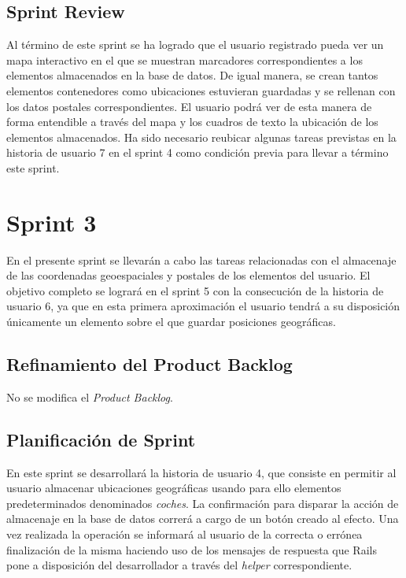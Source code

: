 	\subsection{Sprint Review}
	Al término de este sprint se ha logrado que el usuario registrado pueda ver un mapa interactivo en el que se muestran marcadores correspondientes a los elementos almacenados en la base de datos. De igual manera, se crean tantos elementos contenedores como ubicaciones estuvieran guardadas y se rellenan con los datos postales correspondientes. El usuario podrá ver de esta manera de forma entendible a través del mapa y los cuadros de texto la ubicación de los elementos almacenados. Ha sido necesario reubicar algunas tareas previstas en la historia de usuario 7 en el sprint 4 como condición previa para llevar a término este sprint.
	
\section{Sprint 3}
En el presente sprint se llevarán a cabo las tareas relacionadas con el almacenaje de las coordenadas geoespaciales y postales de los elementos del usuario. El objetivo completo se logrará en el sprint 5 con la consecución de la historia de usuario 6, ya que en esta primera aproximación el usuario tendrá a su disposición únicamente un elemento sobre el que guardar posiciones geográficas.

	\subsection{Refinamiento del Product Backlog}
	No se modifica el \textit{Product Backlog}.
	
	\subsection{Planificación de Sprint}
	En este sprint se desarrollará la historia de usuario 4, que consiste en permitir al usuario almacenar ubicaciones geográficas usando para ello elementos predeterminados denominados \textit{coches}. 
	La confirmación para disparar la acción de almacenaje en la base de datos correrá a cargo de un botón creado al efecto.
	Una vez realizada la operación se informará al usuario de la correcta o errónea finalización de la misma haciendo uso de los mensajes de respuesta que Rails pone a disposición del desarrollador a través del \textit{helper} correspondiente.
	
